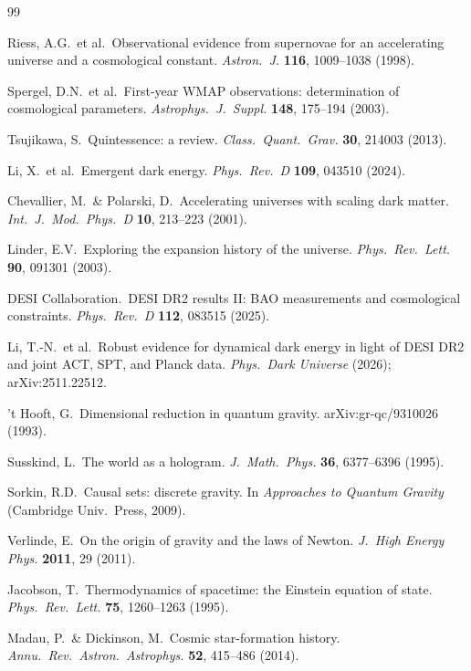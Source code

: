 \documentclass[12pt,a4paper]{article}
\begin{document}
\begin{thebibliography}{99}

Riess, A.G.\ et al.\ Observational evidence from supernovae for an accelerating universe and a cosmological constant. {\it Astron.\ J.} {\bf 116}, 1009--1038 (1998).

Spergel, D.N.\ et al.\ First-year WMAP observations: determination of cosmological parameters. {\it Astrophys.\ J.\ Suppl.} {\bf 148}, 175--194 (2003).

Tsujikawa, S.\ Quintessence: a review. {\it Class.\ Quant.\ Grav.} {\bf 30}, 214003 (2013).

Li, X.\ et al.\ Emergent dark energy. {\it Phys.\ Rev.\ D} {\bf 109}, 043510 (2024).

Chevallier, M.\ \& Polarski, D.\ Accelerating universes with scaling dark matter. {\it Int.\ J.\ Mod.\ Phys.\ D} {\bf 10}, 213--223 (2001).

Linder, E.V.\ Exploring the expansion history of the universe. {\it Phys.\ Rev.\ Lett.} {\bf 90}, 091301 (2003).

DESI Collaboration.\ DESI DR2 results II: BAO measurements and cosmological constraints. {\it Phys.\ Rev.\ D} {\bf 112}, 083515 (2025).

Li, T.-N.\ et al.\ Robust evidence for dynamical dark energy in light of DESI DR2 and joint ACT, SPT, and Planck data. {\it Phys.\ Dark Universe} (2026); arXiv:2511.22512.

't Hooft, G.\ Dimensional reduction in quantum gravity. arXiv:gr-qc/9310026 (1993).

Susskind, L.\ The world as a hologram. {\it J.\ Math.\ Phys.} {\bf 36}, 6377--6396 (1995).

Sorkin, R.D.\ Causal sets: discrete gravity. In {\it Approaches to Quantum Gravity} (Cambridge Univ.\ Press, 2009).

Verlinde, E.\ On the origin of gravity and the laws of Newton. {\it J.\ High Energy Phys.} {\bf 2011}, 29 (2011).

Jacobson, T.\ Thermodynamics of spacetime: the Einstein equation of state. {\it Phys.\ Rev.\ Lett.} {\bf 75}, 1260--1263 (1995).

Madau, P.\ \& Dickinson, M.\ Cosmic star-formation history. {\it Annu.\ Rev.\ Astron.\ Astrophys.} {\bf 52}, 415--486 (2014).


\end{thebibliography}
\end{document}
